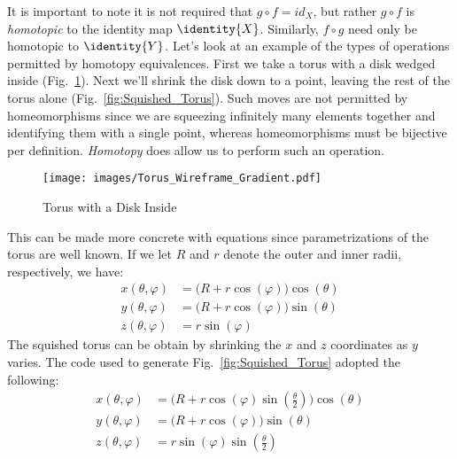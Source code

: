         It is important to note it is not required that
        $g\circ{f}=id_{X}$, but rather $g\circ{f}$ is \textit{homotopic}
        to the identity map $\identity{X}$. Similarly, $f\circ{g}$ need
        only be homotopic to $\identity{Y}$. Let's look at an example of
        the types of operations permitted by homotopy equivalences.
        First we take a torus with a disk wedged inside
        (Fig.~\ref{fig:Torus_with_Disc_Inside}). Next we'll shrink the
        disk down to a point, leaving the rest of the torus alone
        (Fig.~\ref{fig:Squished_Torus}). Such moves are not permitted by
        homeomorphisms since we are squeezing infinitely many elements
        together and identifying them with a single point, whereas
        homeomorphisms must be bijective per definition.
        \textit{Homotopy} does allow us to perform such an operation.
        \begin{figure}[H]
            \centering
            \captionsetup{type=figure}
            \texttt{[image: images/Torus\_Wireframe\_Gradient.pdf]}
            \caption{Torus with a Disk Inside}
            \label{fig:Torus_with_Disc_Inside}
        \end{figure}
        This can be made more concrete with equations since
        parametrizations of the torus are well known. If we let $R$ and
        $r$ denote the outer and inner radii, respectively, we have:
        \begin{subequations}
            \begin{align}
                x(\theta,\varphi)
                    &=\big(R+r\cos(\varphi)\big)\cos(\theta)\\
                y(\theta,\varphi)
                    &=\big(R+r\cos(\varphi)\big)\sin(\theta)\\
                z(\theta,\varphi)&=r\sin(\varphi)
            \end{align}
        \end{subequations}
        The squished torus can be obtain by shrinking the $x$ and $z$
        coordinates as $y$ varies. The code used to generate
        Fig.~\ref{fig:Squished_Torus} adopted the following:
        \begin{subequations}
            \begin{align}
                x(\theta,\varphi)
                    &=\big(R+r\cos(\varphi)\sin(\tfrac{\theta}{2})\big)
                        \cos(\theta)\\
                y(\theta,\varphi)
                    &=\big(R+r\cos(\varphi)\big)\sin(\theta)\\
                z(\theta,\varphi)
                    &=r\sin(\varphi)\sin(\tfrac{\theta}{2})
            \end{align}
        \end{subequations}
